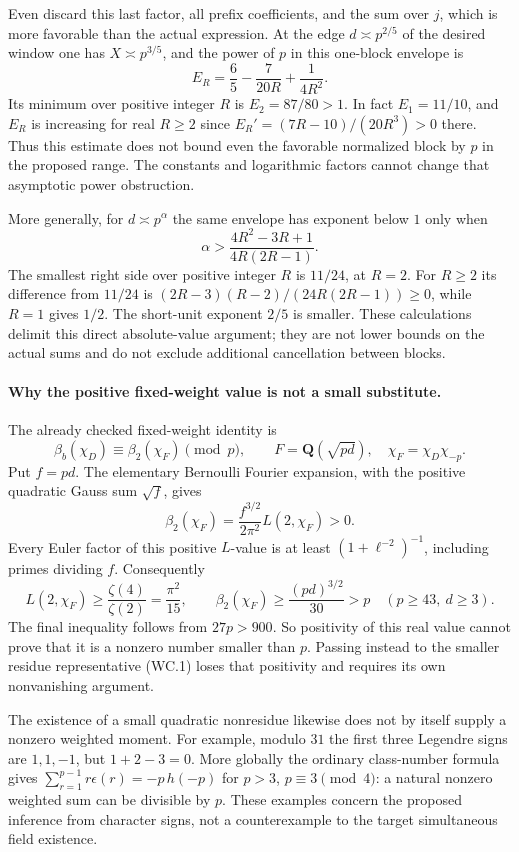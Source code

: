 Even discard this last factor, all prefix coefficients,
and the sum over $j$, which is more favorable than the
actual expression.  At the edge $d\asymp p^{2/5}$ of
the desired window one has $X\asymp p^{3/5}$, and the
power of $p$ in this one-block envelope is
\[
 E_R=\frac65-\frac7{20R}+\frac1{4R^2}.
 \tag{WC.4}
\]
Its minimum over positive integer $R$ is
$E_2=87/80>1$.  In fact $E_1=11/10$, and $E_R$
is increasing for real $R\geq2$ since
$E_R'=(7R-10)/(20R^3)>0$ there.
Thus this estimate does not bound even the favorable
normalized block by $p$ in the proposed range.
The constants and logarithmic factors cannot change
that asymptotic power obstruction.

More generally, for $d\asymp p^\alpha$ the same envelope
has exponent below $1$ only when
\[
 \alpha>
 \frac{4R^2-3R+1}{4R(2R-1)}.
 \tag{WC.5}
\]
The smallest right side over positive integer $R$ is
$11/24$, at $R=2$.  For $R\geq2$ its difference from
$11/24$ is
$(2R-3)(R-2)/(24R(2R-1))\geq0$, while $R=1$
gives $1/2$.  The short-unit exponent $2/5$ is smaller.
These calculations delimit this direct absolute-value
argument; they are not lower bounds on the actual sums
and do not exclude additional cancellation between blocks.

\paragraph{Why the positive fixed-weight value is not a small substitute.}
The already checked fixed-weight identity is
\[
 \beta_b(\chi_D)\equiv\beta_2(\chi_F)\pmod p,
 \qquad F=\mathbf Q(\sqrt{pd}),\quad
 \chi_F=\chi_D\chi_{-p}.
 \tag{WC.6}
\]
Put $f=pd$.  The elementary Bernoulli Fourier expansion,
with the positive quadratic Gauss sum $\sqrt f$, gives
\[
 \beta_2(\chi_F)=\frac{f^{3/2}}{2\pi^2}L(2,\chi_F)>0.
 \tag{WC.7}
\]
Every Euler factor of this positive $L$-value is at least
$(1+\ell^{-2})^{-1}$, including primes dividing $f$.
Consequently
\[
 L(2,\chi_F)\geq\frac{\zeta(4)}{\zeta(2)}
                  =\frac{\pi^2}{15},\qquad
 \beta_2(\chi_F)\geq\frac{(pd)^{3/2}}{30}>p
       \quad(p\geq43,\ d\geq3).
 \tag{WC.8}
\]
The final inequality follows from $27p>900$.
So positivity of this real value cannot prove that it
is a nonzero number smaller than $p$.  Passing instead
to the smaller residue representative (WC.1) loses
that positivity and requires its own nonvanishing argument.

The existence of a small quadratic nonresidue likewise
does not by itself supply a nonzero weighted moment.
For example, modulo $31$ the first three Legendre signs
are $1,1,-1$, but $1+2-3=0$.  More globally the
ordinary class-number formula gives
$\sum_{r=1}^{p-1}r\epsilon(r)=-p\,h(-p)$ for
$p>3$, $p\equiv3\pmod4$: a natural nonzero weighted
sum can be divisible by $p$.  These examples concern
the proposed inference from character signs, not a
counterexample to the target simultaneous field existence.

